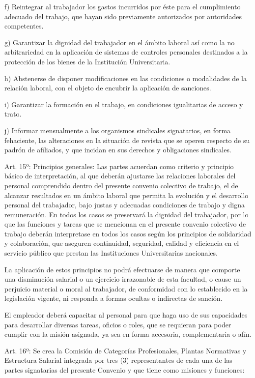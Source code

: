 \documentclass[]{article}
\begin{document}
f) Reintegrar al trabajador los gastos incurridos por éste para el
cumplimiento adecuado del trabajo, que hayan sido previamente
autorizados por autoridades competentes.

g) Garantizar la dignidad del trabajador en el ámbito laboral así como
la no arbitrariedad en la aplicación de sistemas de controles personales
destinados a la protección de los bienes de la Institución
Universitaria.

h) Abstenerse de disponer modificaciones en las condiciones o
modalidades de la relación laboral, con el objeto de encubrir la
aplicación de sanciones.

i) Garantizar la formación en el trabajo, en condiciones igualitarias de
acceso y trato.

j) Informar mensualmente a los organismos sindicales signatarios, en
forma fehaciente, las alteraciones en la situación de revista que se
operen respecto de su padrón de afiliados, y que incidan en sus derechos
y obligaciones sindicales.

Art. 15º: Principios generales: Las partes acuerdan como criterio y
principio básico de interpretación, al que deberán ajustarse las
relaciones laborales del personal comprendido dentro del presente
convenio colectivo de trabajo, el de alcanzar resultados en un ámbito
laboral que permita la evolución y el desarrollo personal del
trabajador, bajo justas y adecuadas condiciones de trabajo y digna
remuneración. En todos los casos se preservará la dignidad del
trabajador, por lo que las funciones y tareas que se mencionan en el
presente convenio colectivo de trabajo deberán interpretase en todos los
casos según los principios de solidaridad y colaboración, que aseguren
continuidad, seguridad, calidad y eficiencia en el servicio público que
prestan las Instituciones Universitarias nacionales.

La aplicación de estos principios no podrá efectuarse de manera que
comporte una disminución salarial o un ejercicio irrazonable de esta
facultad, o cause un perjuicio material o moral al trabajador, de
conformidad con lo establecido en la legislación vigente, ni responda a
formas ocultas o indirectas de sanción.

El empleador deberá capacitar al personal para que haga uso de sus
capacidades para desarrollar diversas tareas, oficios o roles, que se
requieran para poder cumplir con la misión asignada, ya sea en forma
accesoria, complementaria o afín.

Art. 16º: Se crea la Comisión de Categorías Profesionales, Plantas
Normativas y Estructura Salarial integrada por tres (3) representantes
de cada una de las partes signatarias del presente Convenio y que tiene
como misiones y funciones:
\end{document}
